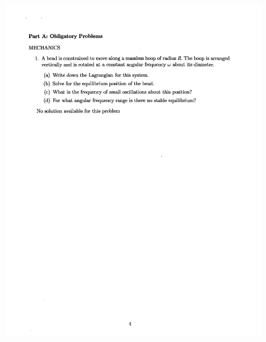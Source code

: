\documentclass[10pt,a4paper]{article}
\begin{document}
\begin{figure}[H]
 \centering
 \includegraphics[width=16cm]{pdf/1-1T31.png}
\end{figure}
 \newpage
\end{document}
